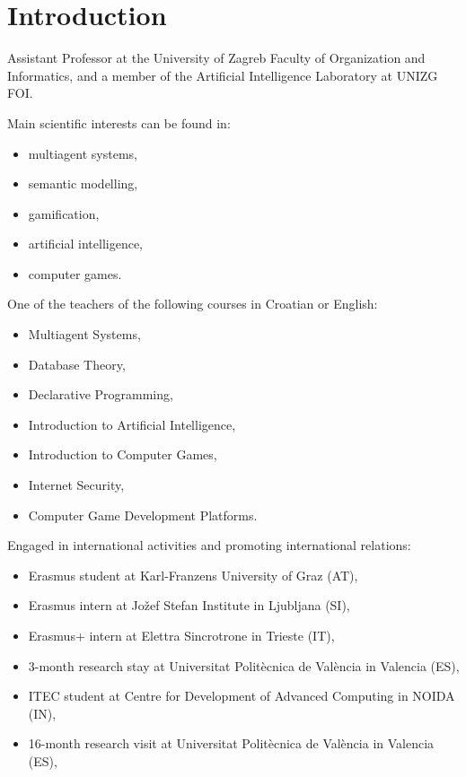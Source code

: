\section{Introduction}

\begin{frame}{\insertsection}
    Assistant Professor at the University of Zagreb \alert{Faculty of Organization and Informatics}, and a member of the Artificial Intelligence Laboratory at UNIZG FOI.
    
    Main scientific interests can be found in:
    \begin{itemize}
        \item multiagent systems,
        \item semantic modelling,
        \item gamification,
        \item artificial intelligence,
        \item computer games.
    \end{itemize}
\end{frame}

\begin{frame}{\insertsection}
    One of the teachers of the following courses in Croatian or English:
    \begin{multicols}{2}
        \begin{itemize}
            \item Multiagent Systems,
            \item Database Theory,
            \item Declarative Programming,
            \item Introduction to Artificial Intelligence,
            \item Introduction to Computer Games,
            \item Internet Security,
            \item Computer Game Development Platforms.
        \end{itemize}
    \end{multicols}
\end{frame}

\begin{frame}{\insertsection}
    Engaged in international activities and promoting international relations:
    \begin{itemize}
        \item Erasmus student at \alert{Karl-Franzens University of Graz} (AT),
        \item Erasmus intern at \alert{Jožef Stefan Institute in Ljubljana} (SI), 
        \item Erasmus+ intern at \alert{Elettra Sincrotrone in Trieste} (IT), 
        \item 3-month research stay at \alert{Universitat Politècnica de València in Valencia} (ES),
        \item ITEC student at \alert{Centre for Development of Advanced Computing in NOIDA} (IN),
        \item 16-month research visit at \alert{Universitat Politècnica de València in Valencia} (ES),
    \end{itemize}
\end{frame}

